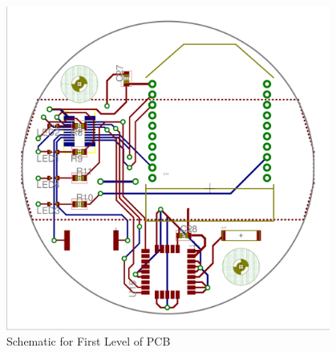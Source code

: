 \begin{figure}[H]
	\centering
	\includegraphics[width=0.95\textwidth]{img/2ndLvlBoard.png}
	\caption{Schematic for First Level of PCB \label{fig:2ndLvlBoard}}
\end{figure}